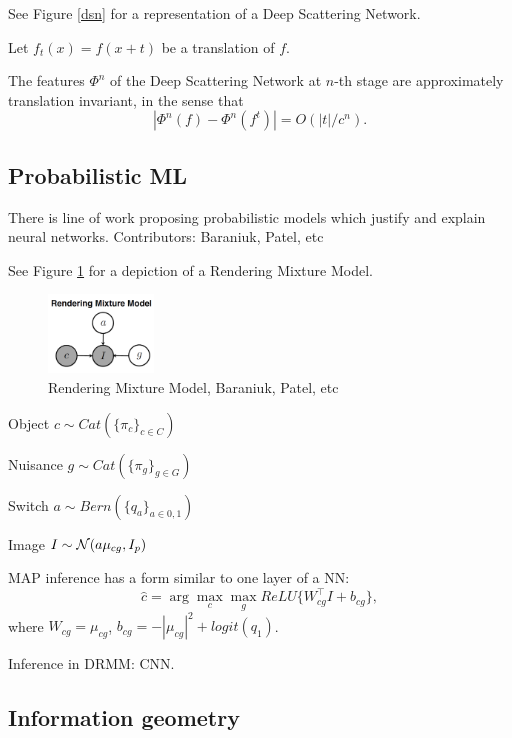 \documentclass[english]{article}
\begin{document}
See Figure \ref{dsn} for a representation of a Deep Scattering Network. 


\begin{theorem}
Let $f_t(x) = f(x+t)$ be a translation of $f$. 

The features $\Phi^n$ of the Deep Scattering Network at $n$-th stage are approximately translation invariant, in the sense that $$|\Phi^n(f) - \Phi^n(f^t)| = O(|t|/c^n).$$
\end{theorem}
%
%
%

\subsection{Probabilistic ML}

There is line of work proposing probabilistic models which justify and explain neural networks.  Contributors: Baraniuk, Patel, etc

See Figure \ref{rmm} for a depiction of a Rendering Mixture Model.

\begin{figure}
  \centering
  \includegraphics[width=0.25\textwidth]{rmm.png}
  \caption{Rendering Mixture Model, Baraniuk, Patel, etc}
  \label{rmm}
\end{figure}

\bitem
\item Object $c \sim Cat(\{\pi_c\}_{c\in C})$
\item Nuisance $g \sim Cat(\{\pi_g\}_{g\in G})$
\item Switch $a \sim Bern(\{q_a\}_{a\in 0,1})$
\item Image $I \sim \mathcal{N}(a\mu_{cg},I_p)$ 
\eitem

\begin{theorem}
MAP inference has a form similar to one layer of a NN:  $$\hat c = \arg\max_c \max_g ReLU\{W_{cg}^\top I+b_{cg}\},$$
where $W_{cg} = \mu_{cg}$, $b_{cg}  = - |\mu_{cg}|^2+logit(q_1)$.
\end{theorem}

Inference in DRMM: CNN. 

\subsection{Information geometry}
\end{document}
